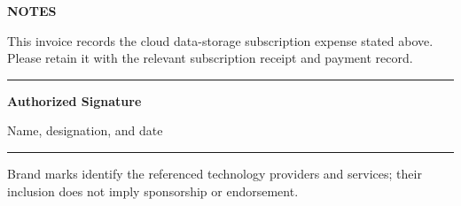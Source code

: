 \documentclass[10pt,a4paper]{article}
\newcommand{\fieldlabel}[1]{{\fontsize{7.5}{9}\selectfont\bfseries\color{TextGray}\MakeUppercase{#1}}}
\begin{document}
\vspace{5mm}

\vfill
\begin{minipage}[b]{0.45\textwidth}
  \fieldlabel{Notes}\par
  \vspace{1.5mm}
  {\footnotesize\color{TextGray}
  This invoice records the cloud data-storage subscription expense stated above. Please retain it with the relevant subscription receipt and payment record.}
\end{minipage}%
\hfill
\begin{minipage}[b]{0.38\textwidth}
  \centering
  \vspace{10mm}
  {\color{RuleGray}\rule{0.88\textwidth}{0.6pt}}\par
  \vspace{1.5mm}
  {\small\bfseries\color{Navy}Authorized Signature}\par
  {\footnotesize\color{TextGray}Name, designation, and date}
\end{minipage}

\vspace{5mm}
{\color{RuleGray}\rule{\textwidth}{0.5pt}}\par
\vspace{1.5mm}
{\centering\fontsize{6.8}{8}\selectfont\color{TextGray}
Brand marks identify the referenced technology providers and services; their inclusion does not imply sponsorship or endorsement.\par}
\end{document}
